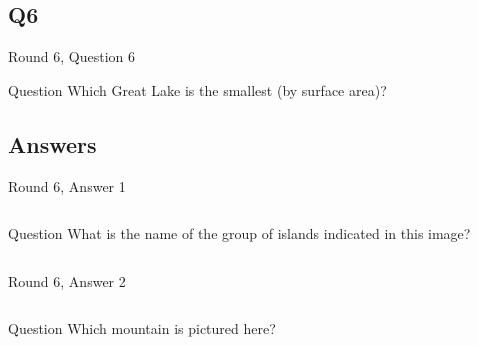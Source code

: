 \documentclass[11pt]{beamer}
\begin{document}
\subsection*{Q6}
\begin{frame}[t]{Round 6, Question 6}
\begin{block}{Question}
Which Great Lake is the smallest (by surface area)?
\end{block}
\end{frame}
\subsection{Answers}
\begin{frame}[t]{Round 6, Answer 1}
\begin{columns}[T,totalwidth=\linewidth]
\begin{column}{0.32\linewidth}
\begin{block}{Question}
What is the name of the group of islands indicated in this image?
\end{block}
\end{column}
\begin{column}{0.65\linewidth}
\begin{center}
\texttt{[image: \{Images/galapagos]}.png}
\end{center}
\end{column}
\end{columns}
\end{frame}
\begin{frame}[t]{Round 6, Answer 2}
\begin{columns}[T,totalwidth=\linewidth]
\begin{column}{0.32\linewidth}
\begin{block}{Question}
Which mountain is pictured here?
\end{block}
\end{column}
\begin{column}{0.65\linewidth}
\begin{center}
\texttt{[image: \{Images/materhorn]}.jpg}
\end{center}
\end{column}
\end{columns}
\end{frame}
\end{document}
